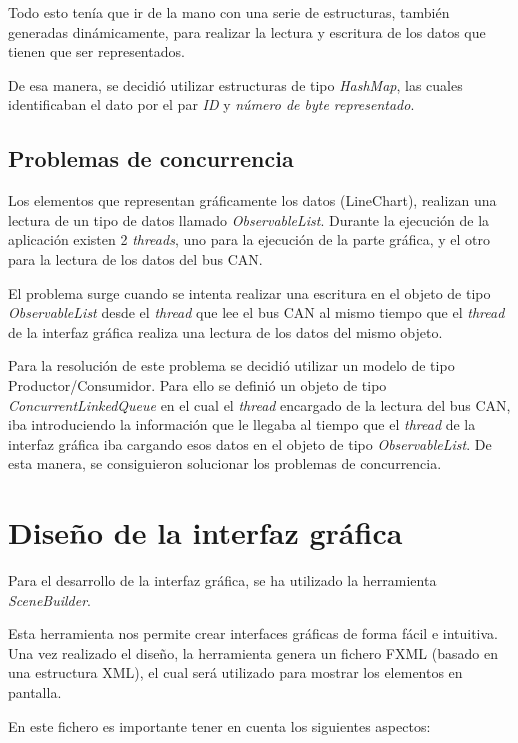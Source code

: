 Todo esto tenía que ir de la mano con una serie de estructuras, también generadas dinámicamente, para realizar la lectura y escritura de los datos que tienen que ser representados.

De esa manera, se decidió utilizar estructuras de tipo \emph{HashMap}, las cuales identificaban el dato por el par \emph{ID} y \emph{número de byte representado}.

\subsection{Problemas de concurrencia}\label{problemas_de_concurrencia}

Los elementos que representan gráficamente los datos (LineChart), realizan una lectura de un tipo de datos llamado \emph{ObservableList}. Durante la ejecución de la aplicación existen 2 \emph{threads}, uno para la ejecución de la parte gráfica, y el otro para la lectura de los datos del bus CAN.

El problema surge cuando se intenta realizar una escritura en el objeto de tipo \emph{ObservableList} desde el \emph{thread} que lee el bus CAN al mismo tiempo que el \emph{thread} de la interfaz gráfica realiza una lectura de los datos del mismo objeto.

Para la resolución de este problema se decidió utilizar un modelo de tipo Productor/Consumidor. Para ello se definió un objeto de tipo \emph{ConcurrentLinkedQueue} en el cual el \emph{thread} encargado de la lectura del bus CAN, iba introduciendo la información que le llegaba al tiempo que el \emph{thread} de la interfaz gráfica iba cargando esos datos en el objeto de tipo \emph{ObservableList}. De esta manera, se consiguieron solucionar los problemas de concurrencia.

\section{Diseño de la interfaz gráfica}\label{diseño_de_la_interfaz_grafica}

Para el desarrollo de la interfaz gráfica, se ha utilizado la herramienta \emph{SceneBuilder}.

Esta herramienta nos permite crear interfaces gráficas de forma fácil e intuitiva. Una vez realizado el diseño, la herramienta genera un fichero FXML (basado en una estructura XML), el cual será utilizado para mostrar los elementos en pantalla.

En este fichero es importante tener en cuenta los siguientes aspectos:

